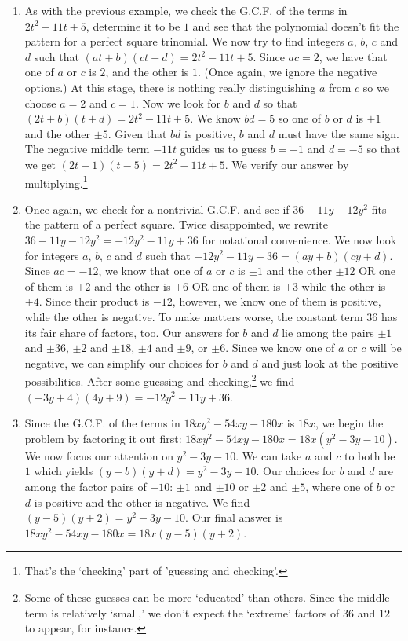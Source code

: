 \begin{ex}
\begin{enumerate}
\item As with the previous example, we check the G.C.F. of the terms in $2t^2 - 11t + 5$, determine it to be $1$ and see that the polynomial doesn't fit the pattern for a perfect square trinomial.  We now try to find integers $a$, $b$, $c$ and $d$ such that $(at+b)(ct+d) = 2t^2 - 11t + 5$.  Since $ac = 2$, we have that one of $a$ or $c$ is $2$, and the other is $1$. (Once again, we ignore the negative options.)  At this stage, there is nothing really distinguishing $a$ from $c$ so we choose $a = 2$ and $c = 1$.  Now we look for $b$ and $d$ so that $(2t + b)(t+d) = 2t^2 - 11t + 5$.  We know $bd = 5$ so one of $b$ or $d$ is $\pm 1$ and the other $\pm 5$. Given that $bd$ is positive, $b$ and $d$ must have the same sign.  The negative middle term $-11t$ guides us to guess $b = -1$ and $d = -5$ so that we get $(2t -1)(t -5) = 2t^2 - 11t + 5$.  We verify our answer by multiplying.\footnote{That's the `checking' part of 'guessing and checking'.}

\item  Once again, we check for a nontrivial G.C.F. and see if $36 - 11y - 12y^2$ fits the pattern of a perfect square.  Twice disappointed, we rewrite $36 - 11y - 12y^2 = -12y^2 - 11y + 36$ for notational convenience.  We now look for integers $a$, $b$, $c$ and $d$ such that $-12y^2 - 11y + 36 = (ay + b)(cy + d)$.  Since $ac =-12$, we know that one of $a$ or $c$ is $\pm 1$ and the other $\pm 12$ OR one of them is $\pm 2$ and the other is $\pm 6$ OR one of them is $\pm 3$ while the other is $\pm 4$. Since their product is $-12$, however, we know one of them is positive, while the other is negative.   To make matters worse, the constant term $36$ has its fair share of factors, too.  Our answers for $b$ and $d$ lie among the pairs $\pm 1$ and $\pm 36$, $\pm 2$ and $\pm 18$, $\pm 4$ and $\pm 9$, or $\pm 6$.  Since we know one of $a$ or $c$ will be negative, we can simplify our choices for $b$ and $d$ and just look at the positive possibilities.  After some guessing and checking,\footnote{Some of these guesses can be more `educated' than others.  Since the middle term is relatively `small,' we don't expect the `extreme' factors of $36$ and $12$ to appear, for instance.} we find $(-3y + 4)(4y+9) = -12y^2 - 11y + 36$.

\item  Since the G.C.F. of the terms in $18xy^2 - 54xy - 180x$  is $18x$, we begin the problem by factoring it out first:  $18xy^2 - 54xy - 180x = 18x(y^2 - 3y - 10)$.  We now focus our attention on $y^2 - 3y - 10$.  We can take $a$ and $c$ to both be $1$ which yields $(y+b)(y+d) = y^2 - 3y - 10$.  Our choices for $b$ and $d$ are among the factor pairs of $-10$: $\pm 1$ and $\pm 10$ or $\pm 2$ and $\pm 5$, where one of $b$ or $d$ is positive and the other is negative.  We find $(y-5)(y+2) = y^2 - 3y - 10$.  Our final answer is $18xy^2 - 54xy - 180x = 18x(y-5)(y+2)$.


\end{enumerate}
\end{ex}
